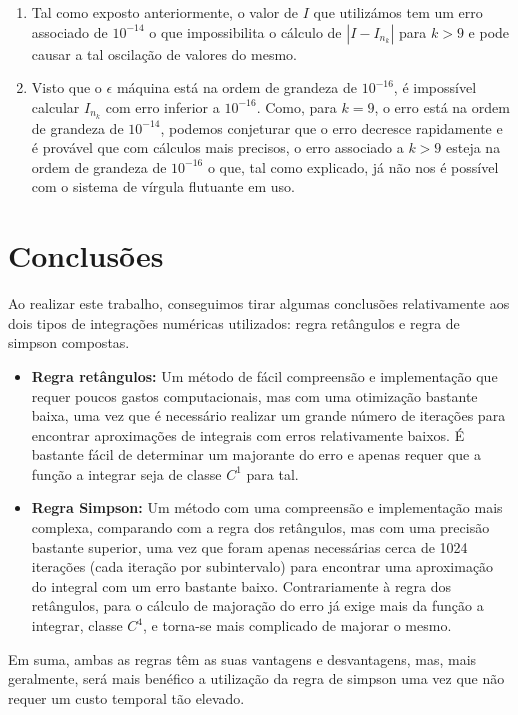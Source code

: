 \documentclass{article}
\begin{document}
\begin{enumerate}
  \item{Tal como exposto anteriormente, o valor de $I$ que utilizámos tem um erro associado de $10^{-14}$ o que impossibilita o cálculo de $|I-I_{n_k}|$ para $k>9$ e pode causar a tal oscilação de valores do mesmo.}
  \item{Visto que o $\epsilon$ máquina está na ordem de grandeza de $10^{-16}$, é impossível calcular $I_{n_k}$ com erro inferior a $10^{-16}$. Como, para $k=9$, o erro está na ordem de grandeza de $10^{-14}$, podemos conjeturar que o erro decresce rapidamente e é provável que com cálculos mais precisos, o erro associado a $k>9$ esteja na ordem de grandeza de $10^{-16}$ o que, tal como explicado, já não nos é possível com o sistema de vírgula flutuante em uso.}
\end{enumerate}
\section*{Conclusões}
\hspace{10mm}Ao realizar este trabalho, conseguimos tirar algumas conclusões relativamente aos dois tipos de integrações numéricas utilizados: regra retângulos e regra de simpson compostas.
\begin{itemize}
  \item{\textbf{Regra retângulos: }Um método de fácil compreensão e implementação que requer poucos gastos computacionais, mas com uma otimização bastante baixa, uma vez que é necessário realizar um grande número de iterações para encontrar aproximações de integrais com erros relativamente baixos. É bastante fácil de determinar um majorante do erro e apenas requer que a função a integrar seja de classe $C^1$ para tal.}
  \item{\textbf{Regra Simpson: }Um método com uma compreensão e implementação mais complexa, comparando com a regra dos retângulos, mas com uma precisão bastante superior, uma vez que foram apenas necessárias cerca de 1024 iterações (cada iteração por subintervalo) para encontrar uma aproximação do integral com um erro bastante baixo. Contrariamente à regra dos retângulos, para o cálculo de majoração do erro já exige mais da função a integrar, classe $C^4$, e torna-se mais complicado de majorar o mesmo.}
\end{itemize}
Em suma, ambas as regras têm as suas vantagens e desvantagens, mas, mais geralmente, será mais benéfico a utilização da regra de simpson uma vez que não requer um custo temporal tão elevado.
\end{document}
